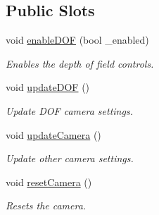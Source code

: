 \subsection*{Public Slots}
\begin{DoxyCompactItemize}
\item 
\hypertarget{class_camera_widget_a61afcd6f680d6ec43b9949c6f324c047}{void \hyperlink{class_camera_widget_a61afcd6f680d6ec43b9949c6f324c047}{enable\-D\-O\-F} (bool \-\_\-enabled)}\label{class_camera_widget_a61afcd6f680d6ec43b9949c6f324c047}

\begin{DoxyCompactList}\small\item\em Enables the depth of field controls. \end{DoxyCompactList}\item 
\hypertarget{class_camera_widget_a94acbc0fd82c07bb2f77c09dc8aafd84}{void \hyperlink{class_camera_widget_a94acbc0fd82c07bb2f77c09dc8aafd84}{update\-D\-O\-F} ()}\label{class_camera_widget_a94acbc0fd82c07bb2f77c09dc8aafd84}

\begin{DoxyCompactList}\small\item\em Update D\-O\-F camera settings. \end{DoxyCompactList}\item 
\hypertarget{class_camera_widget_aafcf078d596c85bd61031163f855e3fa}{void \hyperlink{class_camera_widget_aafcf078d596c85bd61031163f855e3fa}{update\-Camera} ()}\label{class_camera_widget_aafcf078d596c85bd61031163f855e3fa}

\begin{DoxyCompactList}\small\item\em Update other camera settings. \end{DoxyCompactList}\item 
\hypertarget{class_camera_widget_a708a4a1499b94ed542268cd1de8fcb6e}{void \hyperlink{class_camera_widget_a708a4a1499b94ed542268cd1de8fcb6e}{reset\-Camera} ()}\label{class_camera_widget_a708a4a1499b94ed542268cd1de8fcb6e}

\begin{DoxyCompactList}\small\item\em Resets the camera. \end{DoxyCompactList}\end{DoxyCompactItemize}
